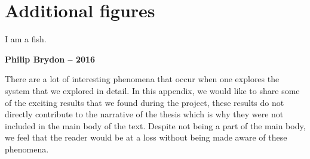 \chapter{Additional figures}
\setlength{}
\epigraph{I am a fish.}{\textbf{Philip Brydon -- 2016}}

There are a lot of interesting phenomena that occur when one explores the system that we explored in detail. In this appendix, we would like to share some of the exciting results that we found during the project, these results do not directly contribute to the narrative of the thesis which is why they were not included in the main body of the text. Despite not being a part of the main body, we feel that the reader would be at a loss without being made aware of these phenomena.
